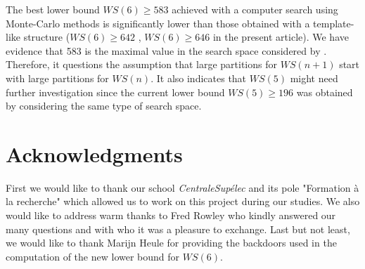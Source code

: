 \documentclass[3p]{elsarticle}
\newtheorem{computational theorem}[definition]{Computational Theorem}
\newcommand{\WS}{\mathit{WS}}
\begin{document}
The best lower bound \(\WS(6) \geqslant 583\) achieved with a computer search using Monte-Carlo methods 
\cite{EliahouBook} is significantly lower than those obtained with a template-like structure (\(\WS(6) \geqslant 642\) \cite{RowleyWS}, 
\(\WS(6) \geqslant 646\) in the present article). We have evidence that 583 is the maximal value in the search space considered by 
\cite{EliahouBook,Bouzy2015AnAP,Rafilipojaona}. Therefore, it questions the assumption that large partitions for \(\WS(n+1)\) 
start with large partitions for \(\WS(n)\). It also indicates that \(\WS(5)\) might need further investigation since the current lower 
bound \(\WS(5) \geqslant 196\) \cite{ELIAHOU2012175} was obtained by considering the same type of search space.


\section{Acknowledgments}

\qquad First we would like to thank our school \textit{CentraleSupélec} and its pole "Formation \`a la recherche" which allowed us to work
on this project during our studies. We also would like to address warm thanks to Fred Rowley who kindly answered our many questions
and with who it was a pleasure to exchange. Last but not least, we would like to thank Marijn Heule for providing the backdoors
used in the computation of the new lower bound for \(\WS(6)\).






\end{document}

